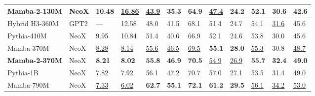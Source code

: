 \begin{table*}[ht]
{\begin{tabular}{@{}llllllllllll@{}}
      \textbf{Mamba-2-130M} & NeoX        & \textbf{10.48}             & \underline{16.86}          & \underline{43.9}          & \textbf{35.3}              & \textbf{64.9}             & \underline{47.4}          & \textbf{24.2}                         & \textbf{52.1}                           & \textbf{30.6}                           & \textbf{42.6} \\
      \midrule
      Hybrid H3-360M        & GPT2        & ---                        & 12.58                      & 48.0                      & 41.5                       & 68.1                      & 51.4                      & 24.7                                  & 54.1                                    & \underline{31.6}                        & 45.6 \\
      Pythia-410M           & NeoX        & 9.95                       & 10.84                      & 51.4                      & 40.6                       & 66.9                      & 52.1                      & 24.6                                  & 53.8                                    & 30.0                                    & 45.6 \\
      Mamba-370M            & NeoX        & \underline{8.28}           & \underline{8.14}           & \underline{55.6}          & \underline{46.5}           & \underline{69.5}          & \textbf{55.1}             & \textbf{28.0}                         & \underline{55.3}                        & 30.8                                    & \underline{48.7} \\
      \textbf{Mamba-2-370M} & NeoX        & \textbf{8.21}              & \textbf{8.02}              & \textbf{55.8}             & \textbf{46.9}              & \textbf{70.5}             & \underline{54.9}          & \underline{26.9}                      & \textbf{55.7}                           & \textbf{32.4}                           & \textbf{49.0} \\
      \midrule
      Pythia-1B             & NeoX        & 7.82                       & 7.92                       & 56.1                      & 47.2                       & 70.7                      & 57.0                      & 27.1                                  & 53.5                                    & 31.4                                    & 49.0 \\
      Mamba-790M            & NeoX        & \underline{7.33}           & \underline{6.02}           & \textbf{62.7}             & \textbf{55.1}              & \textbf{72.1}             & \textbf{61.2}             & \textbf{29.5}                         & \underline{56.1}                        & \underline{34.2}                        & \underline{53.0} \\

\end{tabular}}
\end{table*}
